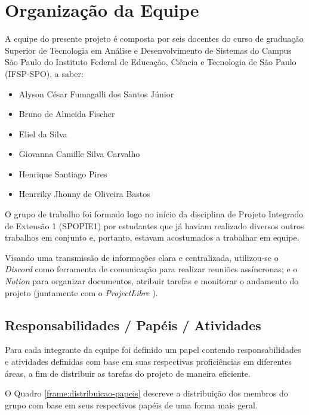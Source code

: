 \section{Organização da Equipe}

A equipe do presente projeto é composta por seis docentes do curso de graduação Superior de Tecnologia em Análise e Desenvolvimento de Sistemas do Campus São Paulo do Instituto Federal de Educação, Ciência e Tecnologia de São Paulo (IFSP-SPO), a saber:

\begin{itemize}
	\item Alyson César Fumagalli dos Santos Júnior
	\item Bruno de Almeida Fischer
	\item Eliel da Silva
	\item Giovanna Camille Silva Carvalho
	\item Henrique Santiago Pires
	\item Henrriky Jhonny de Oliveira Bastos
\end{itemize}

O grupo de trabalho foi formado logo no início da disciplina de Projeto Integrado de Extensão 1 (SPOPIE1) por estudantes que já haviam realizado diversos outros trabalhos em conjunto e, portanto, estavam acostumados a trabalhar em equipe.

Visando uma transmissão de informações clara e centralizada, utilizou-se o \emph{Discord} \cite{discord-2025} como ferramenta de comunicação para realizar reuniões assíncronas; e o \emph{Notion} \cite{notion-2025} para organizar documentos, atribuir tarefas e monitorar o andamento do projeto (juntamente com o \emph{ProjectLibre} \cite{projectlibre-2025}).

\subsection{Responsabilidades / Papéis / Atividades}

Para cada integrante da equipe foi definido um papel contendo responsabilidades e atividades definidas com base em suas respectivas proficiências em diferentes áreas, a fim de distribuir as tarefas do projeto de maneira eficiente.

O Quadro \ref{frame:distribuicao-papeis} descreve a distribuição dos membros do grupo com base em seus respectivos papéis de uma forma mais geral.

